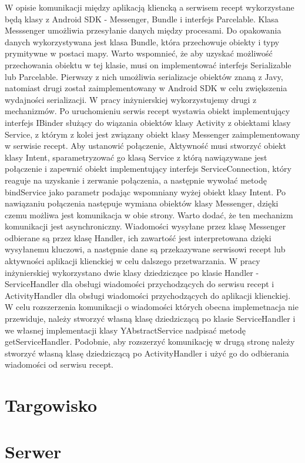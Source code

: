 \documentclass[11pt,a4paper,polish,thesis]{dcsbook}
\begin{document}
W opisie komunikacji między aplikacją kliencką a serwisem recept wykorzystane będą klasy z Android SDK - Messenger, Bundle i interfejs Parcelable. Klasa Messsenger umożliwia przesyłanie danych między procesami. \cite{android.mesage} Do opakowania danych wykorzystywana jest klasa Bundle, która przechowuje obiekty i typy prymitywne w postaci mapy. Warto wspomnieć, że aby uzyskać możliwość przechowania obiektu w tej klasie, musi on implementować interfejs Serializable lub Parcelable. Pierwszy z nich umożliwia serializacje obiektów znaną z Javy, natomiast drugi został zaimplementowany w Android SDK w celu zwiększenia wydajności serializacji. W pracy inżynierskiej wykorzystujemy drugi z mechanizmów. Po uruchomieniu serwis recept wystawia obiekt implementujący interfejs IBinder służący do wiązania obiektów klasy Activity z obiektami klasy Service,  z którym z kolei jest związany obiekt klasy Messenger zaimplementowany w serwisie recept. Aby ustanowić połączenie, Aktywność musi stworzyć obiekt klasy Intent, sparametryzować go klasą Service z którą nawiązywane jest połączenie i zapewnić obiekt implementujący interfejs ServiceConnection, który reaguje na uzyskanie i zerwanie połączenia, a następnie wywołać metodę bindService jako parametr podając wspomniany wyżej obiekt klasy Intent. Po nawiązaniu połączenia następuje wymiana obiektów klasy Messenger, dzięki czemu możliwa jest komunikacja w obie strony. Warto dodać, że ten mechanizm komunikacji jest asynchroniczny. Wiadomości wysyłane przez klasę Messenger odbierane są przez klasę Handler, ich zawartość jest interpretowana dzięki wysyłanemu kluczowi, a następnie dane są przekazywane serwisowi recept lub aktywności aplikacji klienckiej w celu dalszego przetwarzania. W pracy inżynierskiej wykorzystano dwie klasy dziedziczące po klasie Handler - ServiceHandler dla obsługi wiadomości przychodzących do serwisu recept i ActivityHandler dla obsługi wiadomości przychodzących do aplikacji klienckiej. W celu rozszerzenia komunikacji o wiadomości których obecna implemetnacja nie przewiduje, należy stworzyć własną klasę dziedziczącą po klasie ServiceHandler i we własnej implementacji klasy YAbstractService nadpisać metodę getServiceHandler. Podobnie, aby rozszerzyć komunikację w drugą stronę należy stworzyć własną klasę dziedziczącą po ActivityHandler i użyć go do odbierania wiadomości od serwisu recept.
\section{Targowisko}
\section{Serwer}
\end{document}
